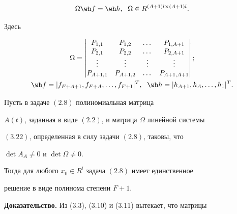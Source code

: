 \begin{equation}


\Omega \wh f=\wh h,\ \;\Omega \in R^{(A+1)l \times (A+1)l}.


\end{equation}


Здесь


\begin{gather*}


\Omega=


\begin{vmatrix}


P_{1,1}     &    P_{1,2}   & \dotsc   & P_{1,A+1}   \\


P_{2,1}     &    P_{2,2}   & \dotsc   & P_{2,A+1}   \\


\vdots      &    \vdots    & \vdots   & \vdots      \\


P_{A+1,1}   &    P_{A+1,2} & \dotsc   & P_{A+1,A+1}


\end{vmatrix}


; \\


\wh f=| f_{F+A+1},f_{F+A}, \dotsc,f_{F+1}|^{T},\ \;


\wh h=| h_{A+1},h_{A}, \dotsc,h_{1}| ^{T}.


\end{gather*}





\begin{thms}


Пусть в задаче $(2.8)$ полиномиальная матрица


$A(t)$, заданная в виде $(2.2)$, и матрица $\Omega$ линейной системы


$(3.22)$, определенная в силу задачи $(2.8)$, таковы, что


$\det A_{A} \neq 0$ и $\det \Omega \neq 0$.





Тогда для любого $x_{0}\in R^{l}$ задача $(2.8)$ имеет единственное


решение в виде полинома степени $F+1$.


\end{thms}





{\bf Доказательство.}  Из (3.3), (3.10) и (3.11) вытекает, что матрицы


